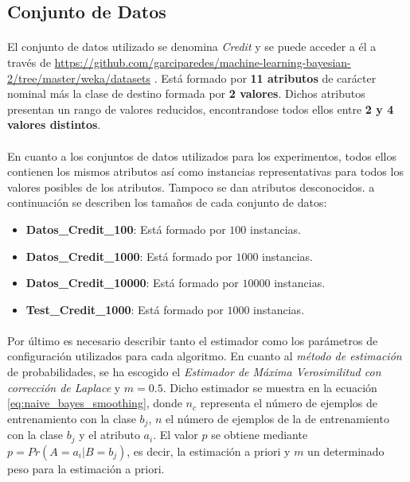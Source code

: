 \documentclass{article}
\begin{document}
		\subsection{Conjunto de Datos}
		\label{sec:data_set}

			\paragraph{}
			El conjunto de datos utilizado se denomina \emph{Credit} y se puede acceder a él a través de \url{https://github.com/garciparedes/machine-learning-bayesian-2/tree/master/weka/datasets} \cite{garciparedes:machine-learning-bayesian-2}. Está formado por \textbf{11 atributos} de carácter nominal más la clase de destino formada por \textbf{2 valores}. Dichos atributos presentan un rango de valores reducidos, encontrandose todos ellos entre \textbf{2 y 4 valores distintos}.

			\paragraph{}
			En cuanto a los conjuntos de datos utilizados para los experimentos, todos ellos contienen los mismos atributos así como instancias representativas para todos los valores posibles de los atributos. Tampoco se dan atributos desconocidos. a continuación se describen los tamaños de cada conjunto de datos:

			\begin{itemize}
				\item \textbf{Datos\_Credit\_100}: Está formado por $100$ instancias.
				\item \textbf{Datos\_Credit\_1000}: Está formado por $1000$ instancias.
				\item \textbf{Datos\_Credit\_10000}: Está formado por $10000$ instancias.
				\item \textbf{Test\_Credit\_1000}: Está formado por $1000$ instancias.
			\end{itemize}

			\paragraph{}
			Por último es necesario describir tanto el estimador como los parámetros de configuración utilizados para cada algoritmo. En cuanto al \emph{método de estimación} de probabilidades, se ha escogido el \emph{Estimador de Máxima Verosimilitud con corrección de Laplace} y $m = 0.5$. Dicho estimador se muestra en la ecuación \eqref{eq:naive_bayes_smoothing}, donde $n_c$ representa el número de ejemplos de entrenamiento con la clase $b_j$, $n$ el número de ejemplos de la de entrenamiento con la clase $b_j$ y el atributo $a_i$. El valor $p$ se obtiene mediante $p = Pr(A = a_i | B = b_j)$, es decir, la estimación a priori y $m$ un determinado peso para la estimación a priori.
\end{document}
